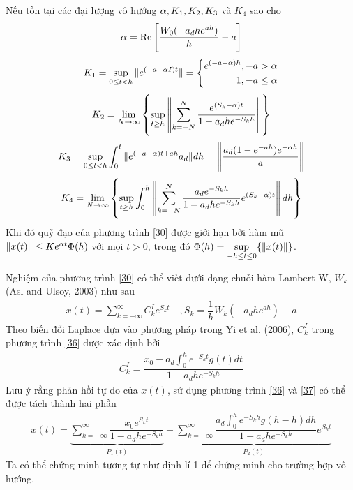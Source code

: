 \begin{hq}
	Nếu tồn tại các đại lượng vô hướng $\alpha, K_1, K_2, K_3$ và $K_4$ sao cho
	\begin{align}\label{31}
		\alpha = \mathrm{Re} \left[ \dfrac{W_0(-a_dhe^{ah})}{h} - a\right]
	\end{align}
\begin{align}\label{32}
	K_1 = \sup \limits_{0 \le t <h} \Vert e^{(-a - \alpha I)t} \Vert 
	= \left\{\begin{aligned} e^{(-a-\alpha)h}, -a > \alpha\\1, -a \le \alpha\end{aligned}\right.
\end{align}
\begin{align}\label{33}
	K_2 = \lim\limits_{N \to \infty} \left\{ \sup \limits_{t \ge h}\left \Vert \sum_{k=-N}^N \dfrac{e^{(S_k-\alpha)t}}{1-a_dhe^{-S_kh}} \right \Vert\right\}
\end{align}
\begin{align}\label{34}
	K_3 = \sup\limits_{0 \le t <h}\int_0^t \Vert e^{(-a - \alpha)t + ah }a_d\Vert dh  = \left \Vert \dfrac{a_d(1-e^{-ah})e^{-\alpha h}}{a}\right \Vert
\end{align}
\begin{align}\label{35}
	K_4= \lim\limits_{N\to \infty} \left\{\sup\limits_{t \ge h} \int_0^h\left\Vert \sum_{k=-N}^N \dfrac{a_de^{-S_kh }}{1-a_dhe^{-S_kh}}e^{(S_k-\alpha)t} \right\Vert dh  \right\}
\end{align}
Khi đó quỹ đạo của phương trình \eqref{30} được giới hạn bởi hàm mũ $\Vert x(t) \Vert \le K e^{\alpha t} \Phi (h)$ với mọi $t >0$, trong đó $\Phi(h) = \sup \limits_{-h \le t \le 0}\{ \Vert x(t)\Vert\}$.
\end{hq}
\begin{cm}
	Nghiệm của phương trình \eqref{30} có thể viết dưới dạng chuỗi hàm Lambert W, $W_k$ (Asl and Ulsoy, 2003) như sau
\begin{align}\label{36}
	x(t) = \sum_{k = -\infty}^{\infty} C^I_ke^{S_kt} \quad , S_k = \dfrac{1}{h}W_k(-a_dhe^{ah})-a
\end{align}	
Theo biến đổi Laplace dựa vào phương pháp trong Yi et al. (2006),  $C_k^I$ trong phương trình \eqref{36} được xác định bởi
\begin{align}\label{37}
	C_k^I = \dfrac{x_0 -a_d\int_{0}^{h}e^{-S_kt}g(t)dt}{1-a_dhe^{-S_kh}}
\end{align}
Lưu ý rằng phản hồi tự do của $x(t)$, sử dụng phương trình \eqref{36} và \eqref{37} có thể được tách thành hai phần
\begin{align}\label{38}
	x(t) = \underbrace{\sum_{k=-\infty}^{\infty} \dfrac{x_0e^{S_kt}}{1-a_dhe^{-S_kh}}}_{P_1(t)} - \underbrace{\sum_{k=-\infty}^{\infty} \dfrac{a_d\int_0^he^{-S_kh }g(h -h)dh }{1-a_dhe^{-S_kh}}e^{S_kt}}_{P_2(t)}
\end{align}
Ta có thể chứng minh tương tự như định lí 1 để chứng minh cho trường hợp vô hướng.
\end{cm}
